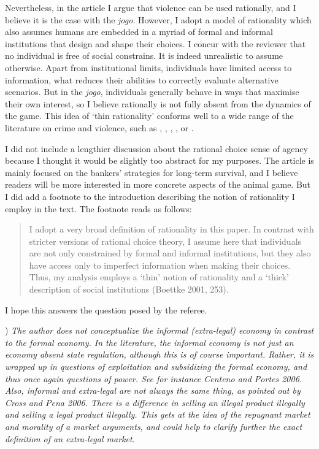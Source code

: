 \documentclass[a4paper,12pt]{article}
\begin{document}
Nevertheless, in the article I argue that violence can be used rationally, and I believe it is the case with the \textit{jogo}. However, I adopt a model of rationality which also assumes humans are embedded in a myriad of formal and informal institutions that design and shape their choices. I concur with the reviewer that no individual is free of social constrains. It is indeed unrealistic to assume otherwise. Apart from institutional limits, individuals have limited access to information, what reduces their abilities to correctly evaluate alternative scenarios. But in the \textit{jogo}, individuals generally behave in ways that maximise their own interest, so I believe rationally is not fully absent from the dynamics of the game. This idea of `thin rationality' conforms well to a wide range of the literature on crime and violence, such as \citet{balcells2010rivalry}, \citet{gambetta1996sicilian,gambetta2009codes}, \citet{kalyvas2006logic}, \citet{leeson2010pirational}, or \citet{skarbek2011governance,skarbek2012prison}. 

I did not include a lengthier discussion about the rational choice sense of agency because I thought it would be slightly too abstract for my purposes. The article is mainly focused on the bankers' strategies for long-term survival, and I believe readers will be more interested in more concrete aspects of the animal game. But I did add a footnote to the introduction describing the notion of rationality I employ in the text. The footnote reads as follows: 

\begin{quote}
	I adopt a very broad definition of rationality in this paper. In contrast with stricter versions of rational choice theory, I assume here that individuals are not only constrained by formal and informal institutions, but they also have access only to imperfect information when making their choices. Thus, my analysis employs a ‘thin’ notion of rationality and a ‘thick’ description of social institutions (Boettke 2001, 253).
\end{quote}

I hope this answers the question posed by the referee. 

\vspace{.5cm}

) \textit{The author does not conceptualize the informal (extra-legal) economy in contrast to the formal economy. In the literature, the informal economy is not just an economy absent state regulation, although this is of course important. Rather, it is wrapped up in questions of exploitation and subsidizing the formal economy, and thus once again questions of power. See for instance Centeno and Portes 2006. Also, informal and extra-legal are not always the same thing, as pointed out by Cross and Pena 2006. There is a difference in selling an illegal product illegally and selling a legal product illegally. This gets at the idea of the repugnant market and morality of a market arguments, and could help to clarify further the exact definition of an extra-legal market.}
\end{document}

